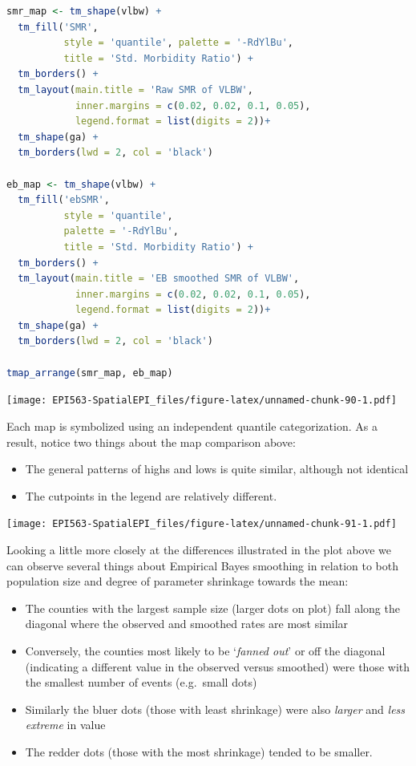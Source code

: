 \documentclass[
]{book}
\providecommand{\tightlist}{%
  \setlength{\itemsep}{0pt}\setlength{\parskip}{0pt}}
\begin{document}
\begin{lstlisting}[language=R]
smr_map <- tm_shape(vlbw) +
  tm_fill('SMR',
          style = 'quantile', palette = '-RdYlBu',
          title = 'Std. Morbidity Ratio') + 
  tm_borders() +
  tm_layout(main.title = 'Raw SMR of VLBW',
            inner.margins = c(0.02, 0.02, 0.1, 0.05),
            legend.format = list(digits = 2))+
  tm_shape(ga) +
  tm_borders(lwd = 2, col = 'black')

eb_map <- tm_shape(vlbw) +
  tm_fill('ebSMR',
          style = 'quantile', 
          palette = '-RdYlBu',
          title = 'Std. Morbidity Ratio') + 
  tm_borders() +
  tm_layout(main.title = 'EB smoothed SMR of VLBW',
            inner.margins = c(0.02, 0.02, 0.1, 0.05),
            legend.format = list(digits = 2))+
  tm_shape(ga) +
  tm_borders(lwd = 2, col = 'black')

tmap_arrange(smr_map, eb_map)
\end{lstlisting}

\texttt{[image: EPI563-SpatialEPI\_files/figure-latex/unnamed-chunk-90-1.pdf]}

Each map is symbolized using an independent quantile categorization. As a result, notice two things about the map comparison above:

\begin{itemize}
\tightlist
\item
  The general patterns of highs and lows is quite similar, although not identical
\item
  The cutpoints in the legend are relatively different.
\end{itemize}

\texttt{[image: EPI563-SpatialEPI\_files/figure-latex/unnamed-chunk-91-1.pdf]}

Looking a little more closely at the differences illustrated in the plot above we can observe several things about Empirical Bayes smoothing in relation to both population size and degree of parameter shrinkage towards the mean:

\begin{itemize}
\tightlist
\item
  The counties with the largest sample size (larger dots on plot) fall along the diagonal where the observed and smoothed rates are most similar
\item
  Conversely, the counties most likely to be `\emph{fanned out}' or off the diagonal (indicating a different value in the observed versus smoothed) were those with the smallest number of events (e.g.~small dots)
\item
  Similarly the bluer dots (those with least shrinkage) were also \emph{larger} and \emph{less extreme} in value
\item
  The redder dots (those with the most shrinkage) tended to be smaller.
\end{itemize}
\end{document}
